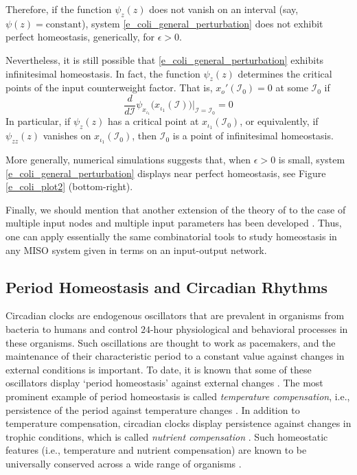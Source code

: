 \documentclass[a4paper,fleqn]{cas-dc}
\newcommand{\II}{{\mathcal I}}
\begin{document}
Therefore, if the function $\psi_z(z)$ does not vanish on an interval (say, $\psi(z)=\text{constant}$), system \eqref{e_coli_general_perturbation} does not exhibit perfect homeostasis, generically, for $\epsilon > 0$.

Nevertheless, it is still possible that \eqref{e_coli_general_perturbation} exhibits infinitesimal homeostasis.
In fact, the function $\psi_z(z)$ determines the critical points of the input counterweight factor.
That is, $x_o'(\II_0)=0$ at some $\II_0$ if 
\[
 \frac{d}{d\II} \psi_{x_{\iota_1}}\big(x_{\iota_1}(\II)\big) \bigg|_{\II=\II_0} = 0
\]
In particular, if $\psi_z(z)$ has a critical point at $x_{\iota_1}(\II_0)$,
or equivalently, if $\psi_{zz}(z)$ vanishes on $x_{\iota_1}(\II_0)$, then $\II_0$ is a point of infinitesimal homeostasis.

More generally, numerical simulations suggests that, when $\epsilon>0$ is small, system \eqref{e_coli_general_perturbation} displays near perfect homeostasis, see Figure \ref{e_coli_plot2} (bottom-right). 

Finally, we should mention that another extension of the theory of \cite{wang2021} to the case of multiple input nodes and multiple input parameters has been developed \cite{madeira2024}.
Thus, one can apply essentially the same combinatorial tools to study homeostasis in any MISO system given in terms on an input-output network.


\subsection{Period Homeostasis and Circadian Rhythms}
\label{SS:PHCR}

Circadian clocks are endogenous oscillators that are prevalent in organisms from bacteria to humans and control $24$-hour physiological and behavioral processes in these organisms. 
Such oscillations are thought to work as pacemakers, and the maintenance of their characteristic period to a constant value against changes in external conditions is important. 
To date, it is known that some of these oscillators display `period homeostasis' against external changes \cite{bell2005}.
The most prominent example of period homeostasis is called \emph{temperature compensation}, i.e., persistence of the period against temperature changes \cite{hk2012}.
In addition to temperature compensation, circadian clocks display persistence against changes in trophic conditions, which is called \emph{nutrient compensation} \cite{phong2013}. 
Such homeostatic features (i.e., temperature and nutrient compensation) are known to be universally
conserved across a wide range of organisms \cite{hk2014}.
\end{document}
